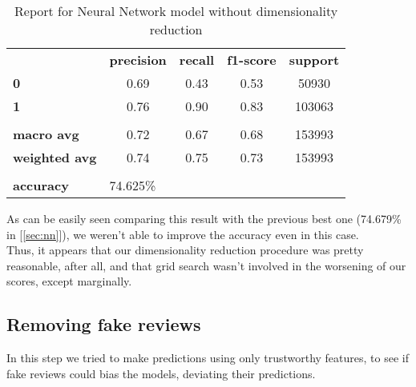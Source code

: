 \begin{table}[h!]
    \centering
    \begin{tabular}{lcccc}
        \rowcolor[HTML]{EEEEEE} 
        \cellcolor[HTML]{FBFBFB} & \textbf{precision} & \textbf{recall} & \textbf{f1-score} & \textbf{support} \\
        \rowcolor[HTML]{EEEEEE} 
        \textbf{0}               & 0.69               & 0.43            & 0.53              & 50930            \\
        \rowcolor[HTML]{EEEEEE} 
        \textbf{1}               & 0.76               & 0.90            & 0.83              & 103063           \\
        \rowcolor[HTML]{FBFBFB} 
        &                    &                 &                   &                  \\
        \rowcolor[HTML]{EEEEEE} 
        \textbf{macro avg}       & 0.72               & 0.67            & 0.68              & 153993           \\
        \rowcolor[HTML]{EEEEEE} 
        \textbf{weighted avg}    & 0.74               & 0.75            & 0.73              & 153993           \\
        \rowcolor[HTML]{FBFBFB} 
        &                    &                 &                   &                  \\
        \rowcolor[HTML]{EEEEEE} 
        \textbf{accuracy}        & \multicolumn{4}{l}{\cellcolor[HTML]{EEEEEE}74.625\%}                         
    \end{tabular}
    \caption{Report for Neural Network model without dimensionality reduction}
    \label{tab:nn-res-no-dim-red}
\end{table}

As can be easily seen comparing this result with the previous best one (74.679\% in [\ref{sec:nn}]), we weren't able to improve the accuracy even in this case.\\
Thus, it appears that our dimensionality reduction procedure was pretty reasonable, after all, and that grid search wasn't involved in the worsening of our scores, except marginally.


\newpage
\subsection{Removing fake reviews} \label{sec:no-fake}

In this step we tried to make predictions using only trustworthy features, to see if fake reviews could bias the models, deviating their predictions.

